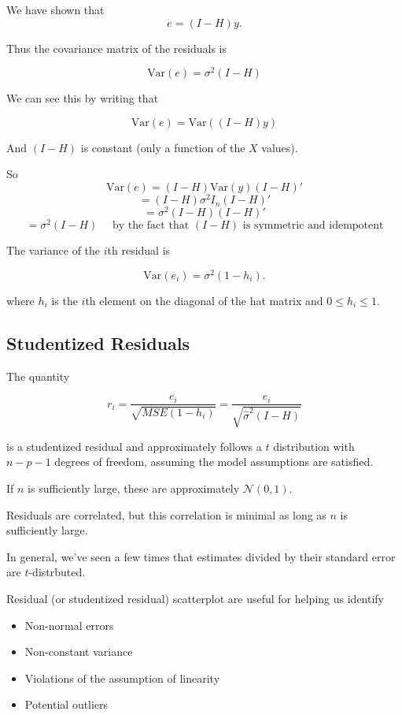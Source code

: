 \documentclass[
  letterpaper,
  DIV=11,
  numbers=noendperiod]{scrreport}
\providecommand{\tightlist}{%
  \setlength{\itemsep}{0pt}\setlength{\parskip}{0pt}}\usepackage{longtable,booktabs,array}
\begin{document}
We have shown that \[e = (I-H)y.\]

Thus the covariance matrix of the residuals is

\[\text{Var}(e) = \sigma^2(I-H)\]

We can see this by writing that

\[\text{Var}(e) = \text{Var}((I - H)y)\]

And \((I-H)\) is constant (only a function of the \(X\) values).

So \[\text{Var}(e) = (I-H)\text{Var}(y)(I-H)'\]
\[ = (I-H)\sigma^2I_n(I-H)'\] \[ = \sigma^2(I-H)(I-H)'\]
\[ = \sigma^2(I-H) \quad \text{ by the fact that } (I-H) \text{ is symmetric and idempotent}\]

The variance of the \(i\)th residual is

\[\text{Var}(e_i) = \sigma^2 (1-h_i).\]

where \(h_i\) is the \(i\)th element on the diagonal of the hat matrix
and \(0 \leq h_i \leq 1\).

\hypertarget{studentized-residuals}{%
\subsection{Studentized Residuals}\label{studentized-residuals}}

The quantity

\[r_i = \frac{e_i}{\sqrt{MSE(1-h_i)}} = \frac{e_i}{\sqrt{\hat\sigma^2(I-H)}}\]

is a {studentized residual} and approximately follows a \(t\)
distribution with \(n - p - 1\) degrees of freedom, assuming the model
assumptions are satisfied.

If \(n\) is sufficiently large, these are approximately
\(\mathcal N(0,1)\).

Residuals are correlated, but this correlation is minimal as long as
\(n\) is sufficiently large.

In general, we've seen a few times that estimates divided by their
standard error are \(t\)-distrbuted.

Residual (or studentized residual) scatterplot are useful for helping us
identify

\begin{itemize}
\tightlist
\item
  Non-normal errors
\item
  Non-constant variance
\item
  Violations of the assumption of linearity
\item
  Potential outliers
\end{itemize}
\end{document}
